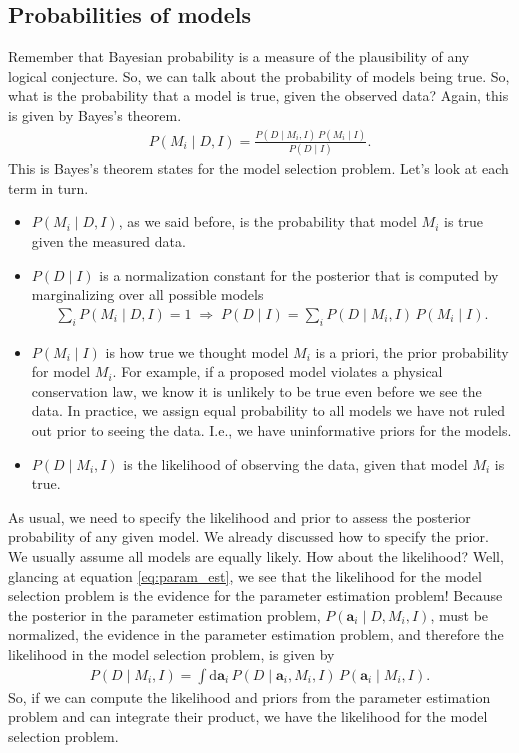 \subsection{Probabilities of models}
Remember that Bayesian probability is a measure of the plausibility of
any logical conjecture.  So, we can talk about the probability of
models being true.  So, what is the probability that a model is true,
given the observed data?  Again, this is given by Bayes's theorem.
\begin{align}
P(M_i\mid D, I) = \frac{P(D\mid M_i, I)\,P(M_i\mid I)}{P(D\mid I)}.
\label{eq:model_selection_bayes}
\end{align}
This is Bayes's theorem states for the model selection problem.  Let's
look at each term in turn.
\begin{itemize}
\item $P(M_i\mid D, I)$, as we said before, is the probability that
  model $M_i$ is true given the measured data.
\item $P(D\mid I)$ is a normalization constant for the posterior that
  is computed by marginalizing over all possible models
  \begin{align}
    \sum_i P(M_i\mid D, I) = 1\;\Rightarrow\;
    P(D\mid I) = \sum_i P(D\mid M_i, I)\,P(M_i\mid I).
  \end{align}
\item $P(M_i \mid I)$ is how true we thought model $M_i$ is a priori,
  the prior probability for model $M_i$.  For example, if a proposed
  model violates a physical conservation law, we know it is unlikely
  to be true even before we see the data.  In practice, we assign
  equal probability to all models we have not ruled out prior to seeing
  the data.  I.e., we have uninformative priors for the models.
\item $P(D\mid M_i, I)$ is the likelihood of observing the data, given
  that model $M_i$ is true.
\end{itemize}

As usual, we need to specify the likelihood and prior to assess the
posterior probability of any given model.  We already discussed how to
specify the prior.  We usually assume all models are equally likely.
How about the likelihood?  Well, glancing at equation
\eqref{eq:param_est}, we see that the likelihood for the model
selection problem is the evidence for the parameter estimation
problem!  Because the posterior in the parameter estimation problem,
$P(\mathbf{a}_i\mid D, M_i, I)$, must be normalized, the evidence in
the parameter estimation problem, and therefore the likelihood in the
model selection problem, is given by
\begin{align}
P(D\mid M_i, I) = \int \mathrm{d}\mathbf{a}_i\,P(D\mid \mathbf{a}_i, M_i, I)\,
P(\mathbf{a}_i\mid M_i, I).
\label{eq:bayes_factor_integral}
\end{align}
So, if we can compute the likelihood and priors from the parameter
estimation problem and can integrate their product, we have the
likelihood for the model selection problem.


